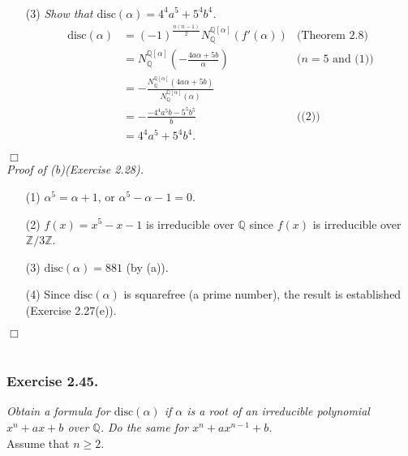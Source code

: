 \documentclass{article}
\begin{document}
\begin{enumerate}
\begin{enumerate}
\begin{align*}
  \end{align*}
  \end{enumerate}
\item[(3)]
\emph{Show that $\text{disc}(\alpha) = 4^4 a^5 + 5^4 b^4$.}
\begin{align*}
\text{disc}(\alpha)
&= (-1)^{\frac{n(n-1)}{2}} N_{\mathbb{Q}}^{\mathbb{Q}[\alpha]}(f'(\alpha))
  &\text{(Theorem 2.8)} \\
&= N_{\mathbb{Q}}^{\mathbb{Q}[\alpha]}\left( -\frac{4a\alpha+5b}{\alpha} \right)
  &\text{($n=5$ and (1))} \\
&= -\frac{N_{\mathbb{Q}}^{\mathbb{Q}[\alpha]}(4a\alpha+5b)}
  {N_{\mathbb{Q}}^{\mathbb{Q}[\alpha]}(\alpha)} \\
&= - \frac{-4^4a^5b-5^5b^5}{b}
  &\text{((2))} \\
&= 4^4 a^5 + 5^4 b^4.
\end{align*}
\end{enumerate}
$\Box$ \\

\emph{Proof of (b)(Exercise 2.28).}
\begin{enumerate}
\item[(1)]
$\alpha^5 = \alpha + 1$, or $\alpha^5 - \alpha - 1 = 0$.
\item[(2)]
$f(x) = x^5 - x - 1$ is irreducible over $\mathbb{Q}$
since $f(x)$ is irreducible over $\mathbb{Z}/3\mathbb{Z}$.
\item[(3)]
$\text{disc}(\alpha) = 881$ (by (a)).
\item[(4)]
Since $\text{disc}(\alpha)$ is squarefree (a prime number),
the result is established (Exercise 2.27(e)).
\end{enumerate}
$\Box$ \\\\






\subsubsection*{Exercise 2.45.}
\emph{Obtain a formula for $\text{disc}(\alpha)$ if $\alpha$ is a root of
an irreducible polynomial $x^n + ax + b$ over $\mathbb{Q}$.
Do the same for $x^n + ax^{n-1}+b$.} \\

Assume that $n \geq 2$. \\
\end{document}
